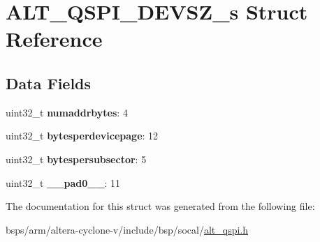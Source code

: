 \hypertarget{structALT__QSPI__DEVSZ__s}{}\section{A\+L\+T\+\_\+\+Q\+S\+P\+I\+\_\+\+D\+E\+V\+S\+Z\+\_\+s Struct Reference}
\label{structALT__QSPI__DEVSZ__s}
\subsection*{Data Fields}
\begin{DoxyCompactItemize}
\item 
\mbox{\label{structALT__QSPI__DEVSZ__s_a4a5c3c2a3e177a53fb28899360593fa7}} 
uint32\+\_\+t {\bfseries numaddrbytes}\+: 4
\item 
\mbox{\label{structALT__QSPI__DEVSZ__s_aa96d13a66c2cd3c71e5af0c4a42c97c7}} 
uint32\+\_\+t {\bfseries bytesperdevicepage}\+: 12
\item 
\mbox{\label{structALT__QSPI__DEVSZ__s_a556cdfe72850063f47458472cd56ddff}} 
uint32\+\_\+t {\bfseries bytespersubsector}\+: 5
\item 
\mbox{\label{structALT__QSPI__DEVSZ__s_a65e405700bae91c7364d49dc8f9eb321}} 
uint32\+\_\+t {\bfseries \+\_\+\+\_\+pad0\+\_\+\+\_\+}\+: 11
\end{DoxyCompactItemize}


The documentation for this struct was generated from the following file\+:\begin{DoxyCompactItemize}
\item 
bsps/arm/altera-\/cyclone-\/v/include/bsp/socal/\mbox{\hyperlink{include_2bsp_2socal_2alt__qspi_8h}{alt\+\_\+qspi.\+h}}\end{DoxyCompactItemize}
